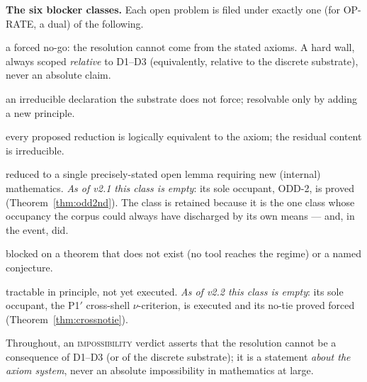 \documentclass[11pt]{article}
\theoremstyle{plain}
\theoremstyle{definition}
\theoremstyle{remark}
\begin{document}
\smallskip\noindent
\textbf{The six blocker classes.} Each open problem is filed under exactly one
(for OP-RATE, a dual) of the following.
\begin{description}[font=\normalfont\scshape,leftmargin=2.2em,style=nextline,itemsep=1pt,topsep=3pt]
\item[impossibility] a forced no-go: the resolution cannot come from the stated
axioms. A hard wall, always scoped \emph{relative} to D1--D3 (equivalently,
relative to the discrete substrate), never an absolute claim.
\item[declared-atom] an irreducible declaration the substrate does not force;
resolvable only by adding a new principle.
\item[restatement-wall] every proposed reduction is logically equivalent to the
axiom; the residual content is irreducible.
\item[named-lemma] reduced to a single precisely-stated open lemma requiring new
(internal) mathematics. \emph{As of v2.1 this class is empty}: its sole
occupant, ODD-2, is proved (Theorem~\ref{thm:odd2nd}). The class is retained
because it is the one class whose occupancy the corpus could always have
discharged by its own means --- and, in the event, did.
\item[external-tool-gap] blocked on a theorem that does not exist (no tool
reaches the regime) or a named conjecture.
\item[unfinished-computation] tractable in principle, not yet executed.
\emph{As of v2.2 this class is empty}: its sole occupant, the P1$'$ cross-shell
$\nu$-criterion, is executed and its no-tie proved forced
(Theorem~\ref{thm:crossnotie}).
\end{description}
Throughout, an \textsc{impossibility} verdict asserts that the resolution cannot
be a consequence of D1--D3 (or of the discrete substrate); it is a statement
\emph{about the axiom system}, never an absolute impossibility in mathematics at
large.
\end{document}
